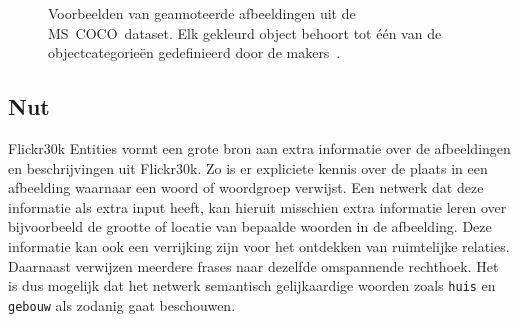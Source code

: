 \begin{figure}
    \centering
    \hfill
    \caption[Voorbeelden van geannoteerde afbeeldingen uit de \mbox{MS COCO dataset}]{Voorbeelden van geannoteerde afbeeldingen uit de \mbox{MS COCO dataset}. Elk gekleurd object behoort tot \'e\'en van de objectcategorie\"en gedefinieerd door de makers~\cite{Lin2014}.}
    \label{fig:cocoexamples}
\end{figure}

\subsection{Nut}
Flickr30k Entities vormt een grote bron aan extra informatie over de afbeeldingen en beschrijvingen uit Flickr30k. Zo is er expliciete kennis over de plaats in een afbeelding waarnaar een woord of woordgroep verwijst. Een netwerk dat deze informatie als extra input heeft, kan hieruit misschien extra informatie leren over bijvoorbeeld de grootte of locatie van bepaalde woorden in de afbeelding. Deze informatie kan ook een verrijking zijn voor het ontdekken van ruimtelijke relaties. Daarnaast verwijzen meerdere frases naar dezelfde omspannende rechthoek. Het is dus mogelijk dat het netwerk semantisch gelijkaardige woorden zoals \texttt{huis} en \texttt{gebouw} als zodanig gaat beschouwen.


